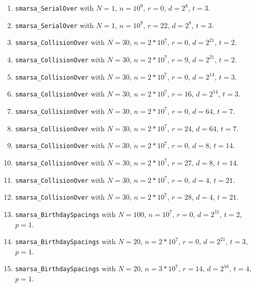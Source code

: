   \begin{enumerate}
  \item {\tt smarsa\_SerialOver} with $N=1$,  $n=10^9$,  $r=0$,
  $d = 2^{8}$, $t=3$.

  \item {\tt smarsa\_SerialOver} with $N=1$,  $n=10^9$,  $r=22$,
  $d = 2^{8}$, $t=3$.

  \item {\tt smarsa\_CollisionOver} with $N=30$,  $n=2*10^7$,  $r=0$,
  $d = 2^{21}$, $t=2$. 

  \item {\tt smarsa\_CollisionOver} with $N=30$,  $n=2*10^7$,  $r=9$,
  $d = 2^{21}$,  $t=2$.
 
  \item {\tt smarsa\_CollisionOver} with $N=30$,  $n=2*10^7$,  $r=0$,
  $d = 2^{14}$, $t=3$. 

  \item {\tt smarsa\_CollisionOver} with $N=30$,  $n=2*10^7$,  $r=16$,
  $d = 2^{14}$,  $t=3$.

  \item {\tt smarsa\_CollisionOver} with $N=30$,  $n=2*10^7$,  $r=0$,
  $d = 64$, $t=7$. 

  \item {\tt smarsa\_CollisionOver} with $N=30$,  $n=2*10^7$,  $r=24$,
  $d = 64$,  $t=7$.

  \item {\tt smarsa\_CollisionOver} with $N=30$,  $n=2*10^7$,  $r=0$,
  $d = 8$, $t=14$. 

  \item {\tt smarsa\_CollisionOver} with $N=30$,  $n=2*10^7$,  $r=27$,
  $d = 8$,  $t=14$.

  \item {\tt smarsa\_CollisionOver} with $N=30$,  $n=2*10^7$,  $r=0$,
  $d =4$,  $t=21$.

  \item {\tt smarsa\_CollisionOver} with $N=30$,  $n=2*10^7$,  $r=28$,
  $d =4$,  $t=21$.

  \item {\tt smarsa\_BirthdaySpacings}  with $N=100$,  $n=10^7$, $r=0$,
   $d = 2^{31}$, $t=2$, $p=1$.

  \item {\tt smarsa\_BirthdaySpacings}  with $N=20$,  $n=2*10^7$, $r=0$,
   $d = 2^{21}$, $t=3$, $p=1$.

  \item {\tt smarsa\_BirthdaySpacings}  with $N=20$,  $n=3*10^7$, $r=14$,
   $d = 2^{16}$, $t=4$, $p=1$.


\end{enumerate}
